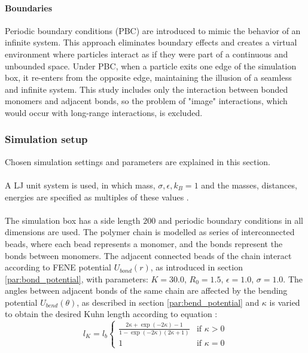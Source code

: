 \documentclass[
    paper=A4,pagesize=automedia,fontsize=12pt,
    BCOR=15mm,DIV=22,
    twoside,headinclude,footinclude=false,
    fleqn,             %
    bibliography=totocnumbered,          %
    listof=totoc,                %
    listof=flat,                 %
    cleardoublepage=empty      %
    numbers=endperiod
]{scrartcl}
\begin{document}
\paragraph{Boundaries}
Periodic boundary conditions (PBC) are introduced to mimic the behavior of an infinite system.
This approach eliminates boundary effects and creates a virtual environment where particles 
interact as if they were part of a continuous and unbounded space.
Under PBC, when a particle exits one edge of the simulation box, it re-enters from the opposite edge, 
maintaining the illusion of a seamless and infinite system. This study includes only the interaction
between bonded monomers and adjacent bonds, so the problem of "image" interactions, which would 
occur with long-range interactions, is excluded. 


\subsubsection{Simulation setup}
Chosen simulation settings and parameters are explained in this section.
\\
\\
A LJ unit system is used, in which 
mass, $\sigma, \epsilon, k_B = 1$ and the masses, distances, energies are specified
as multiples of these values \cite{LAMMPS}.
\\
\\
The simulation box has a side length $200$ and periodic boundary conditions in all 
dimensions are used. The polymer chain is modelled as series of interconnected
beads, where each bead represents a monomer, and the bonds represent the bonds between monomers.
The adjacent connected beads of the chain interact according to FENE potential $U_{bond}(r)$,
as introduced in section \ref{par:bond_potential}, with parameters: 
$K=30.0$, $R_0=1.5$, $\epsilon=1.0$, $\sigma=1.0$.
The angles between adjacent bonds of the same chain are affected by the bending potential
$U_{bend}(\theta)$, as described in section \ref{par:bend_potential} and 
$\kappa$ is varied to obtain the
desired Kuhn length according to equation \cite{svaneborg_2020}:
\begin{equation}
    l_K = l_b 
    \begin{cases}
        \frac{2 \kappa + \exp(-2 \kappa) - 1}{1-\exp(-2\kappa)(2\kappa + 1)} & \text{if } \kappa > 0 \\
        1 & \text{if } \kappa = 0 
    \end{cases}
\end{equation}
\\
\end{document}
